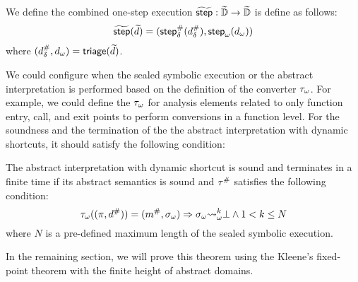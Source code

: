\begin{definition}
  We define the combined one-step execution $\widetilde{\textsf{step}}: \widetilde{\mathbb{D}} \rightarrow
  \widetilde{\mathbb{D}}$ is define as follows:
  \[
    \widetilde{\textsf{step}}(\widetilde{d}) = (
      {\textsf{step}}^{\#}_\delta({d}^{\#}_\delta),
      {\textsf{step}}_\omega({d}_\omega)
    )
  \]
  where $({d}^{\#}_\delta, {d}_\omega) = \textsf{triage}(\widetilde{d})$.
\end{definition}

We could configure when the sealed symbolic execution or the abstract
interpretation is performed based on the definition of the converter
${\tau}_\omega$.  For example, we could define the ${\tau}_\omega$ for analysis
elements related to only function entry, call, and exit points to perform
conversions in a function level.  For the soundness and the termination of the
the abstract interpretation with dynamic shortcuts, it should satisfy the
following condition:
\begin{theorem}\label{theorem:shortcut}
  The abstract interpretation with dynamic shortcut is sound and terminates in a
  finite time if its abstract semantics is sound and ${\tau}^{\#}$ satisfies the
  following condition:
  \begin{equation}\label{expr:condition}
    {\tau}_\omega((\pi, {d}^{\#})) = ({m}^{\#}, {\sigma}_\omega) \Rightarrow
    {\sigma}_\omega {\leadsto}_\omega^k \bot \wedge 1 < k \leq N
  \end{equation}
  where $N$ is a pre-defined maximum length of the sealed symbolic execution.
\end{theorem}

In the remaining section, we will prove this theorem using the Kleene's
fixed-point theorem with the finite height of abstract domains.

